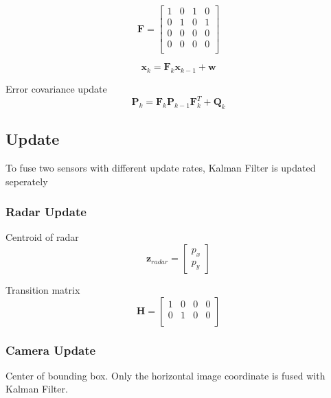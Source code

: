 \begin{equation}\label{equ:transition_matrix_H}
    \mathbf{F} = 
    \begin{bmatrix}
        1 & 0 & 1 & 0 \\
        0 & 1 & 0 & 1 \\
        0 & 0 & 0 & 0 \\
        0 & 0 & 0 & 0 \\
      \end{bmatrix}
\end{equation}

\begin{equation}\label{equ:predict_eq}
    \mathbf{x}_k=\mathbf{F}_k\mathbf{x}_{k-1}+\mathbf{w}
\end{equation}

Error covariance update
\begin{equation}\label{equ:error_covariance}
    \mathbf{P}_k=\mathbf{F}_k \mathbf{P}_{k-1} \mathbf{F}_k^T+\mathbf{Q}_k
\end{equation}

\subsection{Update}\label{equ:2-update}
To fuse two sensors with different update rates, Kalman Filter is updated seperately
\subsubsection{Radar Update}\label{sec:2-radar_update}  
Centroid of radar
\begin{equation}
    \mathbf{z}_{radar}=
    \begin{bmatrix}
        p_x \\ 
        p_y
    \end{bmatrix}
\end{equation}

Transition matrix
\begin{equation}\label{equ:2-radar_transition_matrix}
    \mathbf{H} = 
    \begin{bmatrix}
        1 & 0 & 0 & 0 \\
        0 & 1 & 0 & 0 \\
      \end{bmatrix}
\end{equation}



\subsubsection{Camera Update}\label{sec:2-camera_update}
Center of bounding box.
Only the horizontal image coordinate is fused with Kalman Filter.

